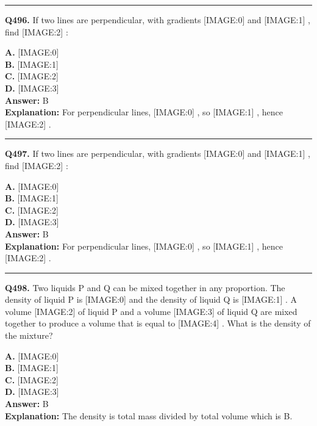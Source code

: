 \documentclass[12pt]{article}
\begin{document}
\hrule
\vspace{1em}


\noindent
\textbf{Q496.} If two lines are perpendicular, with gradients
[IMAGE:0]
and
[IMAGE:1]
, find
[IMAGE:2]
:



\textbf{A.} [IMAGE:0] \\
\textbf{B.} [IMAGE:1] \\
\textbf{C.} [IMAGE:2] \\
\textbf{D.} [IMAGE:3] \\

\textbf{Answer:} B \\
\textbf{Explanation:} For perpendicular lines,
[IMAGE:0]
, so
[IMAGE:1]
, hence
[IMAGE:2]
.

\hrule
\vspace{1em}


\noindent
\textbf{Q497.} If two lines are perpendicular, with gradients
[IMAGE:0]
and
[IMAGE:1]
, find
[IMAGE:2]
:



\textbf{A.} [IMAGE:0] \\
\textbf{B.} [IMAGE:1] \\
\textbf{C.} [IMAGE:2] \\
\textbf{D.} [IMAGE:3] \\

\textbf{Answer:} B \\
\textbf{Explanation:} For perpendicular lines,
[IMAGE:0]
, so
[IMAGE:1]
, hence
[IMAGE:2]
.

\hrule
\vspace{1em}


\noindent
\textbf{Q498.} Two liquids P and Q can be mixed together in any proportion. The density of liquid P is
[IMAGE:0]
and the density of liquid Q is
[IMAGE:1]
. A volume
[IMAGE:2]
of liquid P and a volume
[IMAGE:3]
of liquid Q are mixed together to produce a volume that is equal to
[IMAGE:4]
. What is the density of the mixture?



\textbf{A.} [IMAGE:0] \\
\textbf{B.} [IMAGE:1] \\
\textbf{C.} [IMAGE:2] \\
\textbf{D.} [IMAGE:3] \\

\textbf{Answer:} B \\
\textbf{Explanation:} The density is total mass divided by total volume which is B.
\end{document}
